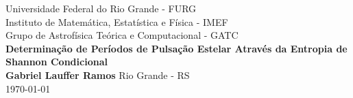\documentclass[
12pt, %
english, brazil, %
doublespacing,
nolistspacing, %
liststotoc, %
]{MastersDoctoralThesis} %
\begin{document}
\begin{titlepage}
\begin{center}
\large
Universidade Federal do Rio Grande - FURG \\
Instituto de Matemática, Estatística e Física - IMEF \\
Grupo de Astrofísica Teórica e Computacional - GATC\\
\vspace{5cm}
\Huge
\textbf{Determinação de Períodos de Pulsação Estelar Através da Entropia de Shannon Condicional} \\
\vspace{3cm}
\Large
\textbf{Gabriel Lauffer Ramos}
\vfill
\large
Rio Grande - RS \\
\today
\end{center}
\end{titlepage}
\end{document}
